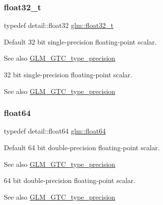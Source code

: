 \subsubsection{\texorpdfstring{float32\+\_\+t}{float32\_t}}
{\footnotesize\ttfamily typedef detail\+::float32 \hyperlink{group__gtc__type__precision_ga642737ae3e7c434b366f2191e6944bf2}{glm\+::float32\+\_\+t}}

Default 32 bit single-\/precision floating-\/point scalar. \begin{DoxySeeAlso}{See also}
\hyperlink{group__gtc__type__precision}{G\+L\+M\+\_\+\+G\+T\+C\+\_\+type\+\_\+precision}
\end{DoxySeeAlso}
32 bit single-\/precision floating-\/point scalar. \begin{DoxySeeAlso}{See also}
\hyperlink{group__gtc__type__precision}{G\+L\+M\+\_\+\+G\+T\+C\+\_\+type\+\_\+precision} 
\end{DoxySeeAlso}
\mbox{\label{group__gtc__type__precision_gab721f828b41f46b20cf4883b50733d3b}} 
\subsubsection{\texorpdfstring{float64}{float64}}
{\footnotesize\ttfamily typedef detail\+::float64 \hyperlink{group__gtc__type__precision_gab721f828b41f46b20cf4883b50733d3b}{glm\+::float64}}

Default 64 bit double-\/precision floating-\/point scalar. \begin{DoxySeeAlso}{See also}
\hyperlink{group__gtc__type__precision}{G\+L\+M\+\_\+\+G\+T\+C\+\_\+type\+\_\+precision}
\end{DoxySeeAlso}
64 bit double-\/precision floating-\/point scalar. \begin{DoxySeeAlso}{See also}
\hyperlink{group__gtc__type__precision}{G\+L\+M\+\_\+\+G\+T\+C\+\_\+type\+\_\+precision} 
\end{DoxySeeAlso}
\mbox{\label{group__gtc__type__precision_gade966a3eb25ebeb16dd53c40d3fdeb46}} 

